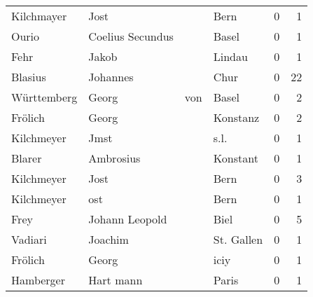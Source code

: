 \begin{center}
\begin{tiny}
\begin{longtabu}{llllrr}
               Kilchmayer &                               Jost &             &                                        Bern &          0 &         1 \\
                    Ourio &                   Coelius Secundus &             &                                       Basel &          0 &         1 \\
                     Fehr &                              Jakob &             &                                      Lindau &          0 &         1 \\
                  Blasius &                           Johannes &             &                                        Chur &          0 &        22 \\
              Württemberg &                              Georg &         von &                                       Basel &          0 &         2 \\
                  Frölich &                              Georg &             &                                    Konstanz &          0 &         2 \\
               Kilchmeyer &                               Jmst &             &                                        s.l. &          0 &         1 \\
                   Blarer &                          Ambrosius &             &                                    Konstant &          0 &         1 \\
               Kilchmeyer &                               Jost &             &                                        Bern &          0 &         3 \\
               Kilchmeyer &                                ost &             &                                        Bern &          0 &         1 \\
                     Frey &                     Johann Leopold &             &                                        Biel &          0 &         5 \\
                  Vadiari &                            Joachim &             &                                  St. Gallen &          0 &         1 \\
                  Frölich &                              Georg &             &                                        iciy &          0 &         1 \\
                Hamberger &                          Hart mann &             &                                       Paris &          0 &         1 \\

\end{longtabu}
\end{tiny}
\end{center}

